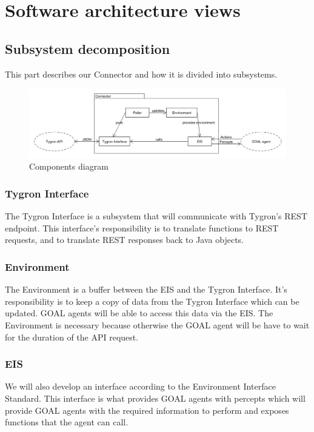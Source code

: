 \documentclass[a4paper]{article}
\begin{document}
\clearpage

\section{Software architecture views}
\subsection{Subsystem decomposition}
This part describes our Connector and how it is divided into subsystems.

\begin{figure}[h!]
  \caption{Components diagram}
  \centering
    \includegraphics[width=1.0\textwidth]{components diagram.png}
\end{figure}

\subsubsection{Tygron Interface}
The Tygron Interface is a subsystem that will communicate with Tygron’s REST endpoint. This interface’s responsibility is to translate functions to REST requests, and to translate REST responses back to Java objects.

\subsubsection{Environment}
The Environment is a buffer between the EIS and the Tygron Interface. It’s responsibility is to keep a copy of data from the Tygron Interface which can be updated. GOAL agents will be able to access this data via the EIS. The Environment is necessary because otherwise the GOAL agent will be have to wait for the duration of the API request.

\subsubsection{EIS}
We will also develop an interface according to the Environment Interface Standard. This interface is what provides GOAL agents with percepts which will provide GOAL agents with the required information to perform and exposes functions that the agent can call.
\end{document}
